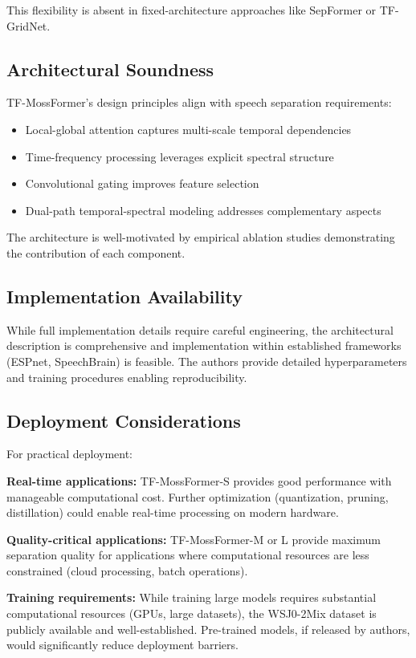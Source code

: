 \documentclass[conference]{IEEEtran}
\begin{document}
This flexibility is absent in fixed-architecture approaches like SepFormer or TF-GridNet.

\subsection{Architectural Soundness}

TF-MossFormer's design principles align with speech separation requirements:
\begin{itemize}
    \item Local-global attention captures multi-scale temporal dependencies
    \item Time-frequency processing leverages explicit spectral structure
    \item Convolutional gating improves feature selection
    \item Dual-path temporal-spectral modeling addresses complementary aspects
\end{itemize}

The architecture is well-motivated by empirical ablation studies demonstrating the contribution of each component.

\subsection{Implementation Availability}

While full implementation details require careful engineering, the architectural description is comprehensive and implementation within established frameworks (ESPnet, SpeechBrain) is feasible. The authors provide detailed hyperparameters and training procedures enabling reproducibility.

\subsection{Deployment Considerations}

For practical deployment:

\textbf{Real-time applications:} TF-MossFormer-S provides good performance with manageable computational cost. Further optimization (quantization, pruning, distillation) could enable real-time processing on modern hardware.

\textbf{Quality-critical applications:} TF-MossFormer-M or L provide maximum separation quality for applications where computational resources are less constrained (cloud processing, batch operations).

\textbf{Training requirements:} While training large models requires substantial computational resources (GPUs, large datasets), the WSJ0-2Mix dataset is publicly available and well-established. Pre-trained models, if released by authors, would significantly reduce deployment barriers.
\end{document}
